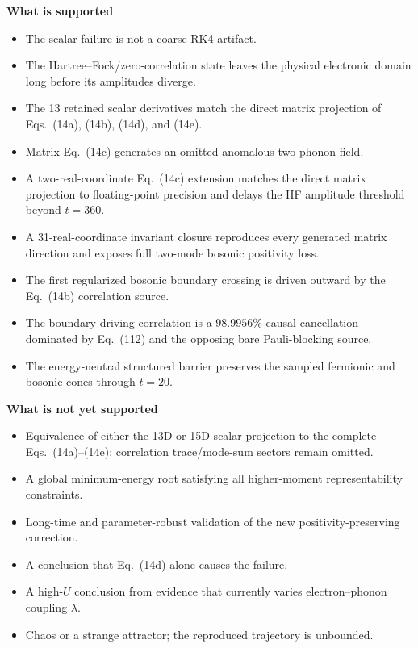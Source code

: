 \documentclass[10pt]{article}
\begin{document}
\vspace{0.25em}
\begin{minipage}[t]{0.49\textwidth}
\textbf{What is supported}
\begin{itemize}
  \item The scalar failure is not a coarse-RK4 artifact.
  \item The Hartree--Fock/zero-correlation state leaves the physical electronic
        domain long before its amplitudes diverge.
  \item The 13 retained scalar derivatives match the direct matrix projection
        of Eqs.~(14a), (14b), (14d), and (14e).
  \item Matrix Eq.~(14c) generates an omitted anomalous two-phonon field.
  \item A two-real-coordinate Eq.~(14c) extension matches the direct matrix
        projection to floating-point precision and delays the HF amplitude
        threshold beyond \(t=360\).
  \item A 31-real-coordinate invariant closure reproduces every generated
        matrix direction and exposes full two-mode bosonic positivity loss.
  \item The first regularized bosonic boundary crossing is driven outward by
        the Eq.~(14b) correlation source.
  \item The boundary-driving correlation is a \(98.9956\%\) causal
        cancellation dominated by Eq.~(112) and the opposing bare
        Pauli-blocking source.
  \item The energy-neutral structured barrier preserves the sampled fermionic
        and bosonic cones through \(t=20\).
\end{itemize}
\end{minipage}\hfill
\begin{minipage}[t]{0.49\textwidth}
\textbf{What is not yet supported}
\begin{itemize}
  \item Equivalence of either the 13D or 15D scalar projection to the complete
        Eqs.~(14a)--(14e); correlation trace/mode-sum sectors remain omitted.
  \item A global minimum-energy root satisfying all higher-moment
        representability constraints.
  \item Long-time and parameter-robust validation of the new
        positivity-preserving correction.
  \item A conclusion that Eq.~(14d) alone causes the failure.
  \item A high-\(U\) conclusion from evidence that currently varies
        electron--phonon coupling \(\lambda\).
  \item Chaos or a strange attractor; the reproduced trajectory is unbounded.
\end{itemize}
\end{minipage}
\end{document}
